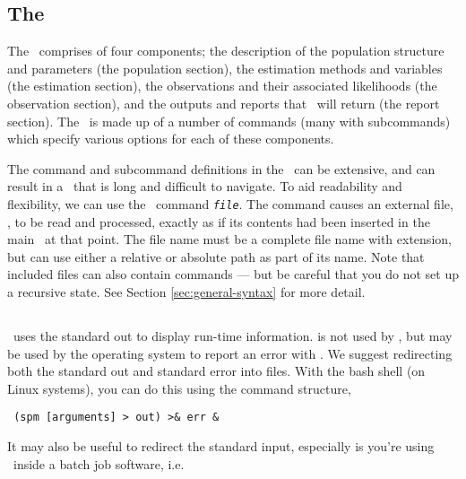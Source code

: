 \subsection{The \config\label{sec:config-files}}

The \config\ comprises of four components; the description of the population structure and parameters (the population section), the estimation methods and variables (the estimation section), the observations and their associated likelihoods (the observation section), and the outputs and reports that \SPM\ will return (the report section). The \config\ is made up of a number of commands (many with subcommands) which specify various options for each of these components.

The command and subcommand definitions in the \config\ can be extensive, and can result in a \config\ that is long and difficult to navigate. To aid readability and flexibility, we can use the \config\ command  \texttt{\emph{file}}. The command causes an external file, , to be read and processed, exactly as if its contents had been inserted in the main \config\ at that point. The file name must be a complete file name with extension, but can use either a relative or absolute path as part of its name. Note that included files can also contain  commands --- but be careful that you do not set up a recursive state. See Section \ref{sec:general-syntax} for more detail.

\subsection{\label{sec:redirecting-stdout}}

\SPM\ uses the standard out to display run-time information.  is not used by \SPM, but may be used by the operating system to report an error with \SPM. We suggest redirecting both the standard out and standard error into files. With the bash shell (on Linux systems), you can do this using the command structure,

\begin{verbatim} (spm [arguments] > out) >& err &\end{verbatim}

It may also be useful to redirect the standard input, especially is you're using \SPM\ inside a batch job software, i.e. 

